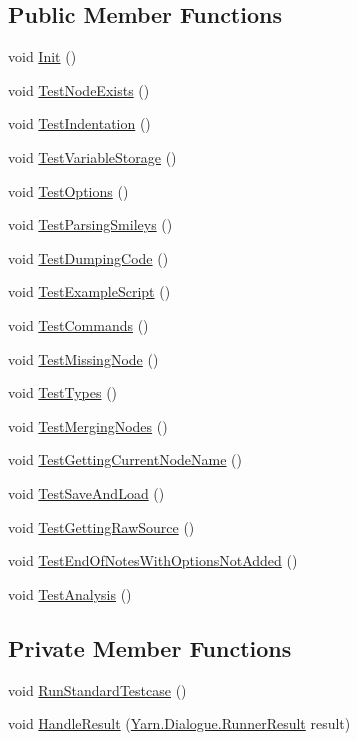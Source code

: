 \subsection*{Public Member Functions}
\begin{DoxyCompactItemize}
\item 
void \hyperlink{a00077_a1a64841e6815e57869c1132427a44349}{Init} ()
\item 
void \hyperlink{a00077_a2beee99e50888b2813bb4cb1b5d7db1f}{Test\-Node\-Exists} ()
\item 
void \hyperlink{a00077_a7367e28f0328bc09e1129c2c86026d34}{Test\-Indentation} ()
\item 
void \hyperlink{a00077_aa27a8cd7c1926ae4d92956a5f6a24d9e}{Test\-Variable\-Storage} ()
\item 
void \hyperlink{a00077_aecbebd20a89e19887c38cc45deb33551}{Test\-Options} ()
\item 
void \hyperlink{a00077_a9d1192dcf67863cfc835368d1c14916f}{Test\-Parsing\-Smileys} ()
\item 
void \hyperlink{a00077_a7ff97d839b8ce04eb6493afd4698c829}{Test\-Dumping\-Code} ()
\item 
void \hyperlink{a00077_afe989298d1984b105f2f187a42d54134}{Test\-Example\-Script} ()
\item 
void \hyperlink{a00077_a95f63c81611bdee5f210c61201546658}{Test\-Commands} ()
\item 
void \hyperlink{a00077_addf4c602c21c9c541adee828f8b7c0f8}{Test\-Missing\-Node} ()
\item 
void \hyperlink{a00077_a2d3abf96f13b1a8f111952e5294ada67}{Test\-Types} ()
\item 
void \hyperlink{a00077_a65c83f97636c7d2c0ba63d1ed0fa7881}{Test\-Merging\-Nodes} ()
\item 
void \hyperlink{a00077_a8eaf016cf430c42648190a2fdd9e9ad2}{Test\-Getting\-Current\-Node\-Name} ()
\item 
void \hyperlink{a00077_aaa4a2d0a30511d5d12459e3bb470b615}{Test\-Save\-And\-Load} ()
\item 
void \hyperlink{a00077_a6ba6563aea2806d7ec783f0bb4d26932}{Test\-Getting\-Raw\-Source} ()
\item 
void \hyperlink{a00077_a3f4243133a4195c80f39469f2d9875d2}{Test\-End\-Of\-Notes\-With\-Options\-Not\-Added} ()
\item 
void \hyperlink{a00077_a7034c82755c2b23d547102aa41770df1}{Test\-Analysis} ()
\end{DoxyCompactItemize}
\subsection*{Private Member Functions}
\begin{DoxyCompactItemize}
\item 
void \hyperlink{a00077_a65293f2e8ed643371fefe8479842ce6a}{Run\-Standard\-Testcase} ()
\item 
void \hyperlink{a00077_a132f6bdec5940f30a11d3e8be05ce7e4}{Handle\-Result} (\hyperlink{a00069}{Yarn.\-Dialogue.\-Runner\-Result} result)
\end{DoxyCompactItemize}
